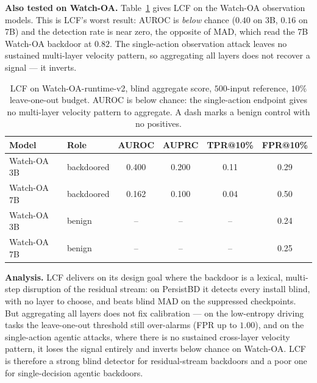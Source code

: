 \documentclass[11pt]{article}
\begin{document}
\textbf{Also tested on Watch-OA.} Table~\ref{tab:lcf-watchoa} gives LCF on the Watch-OA
observation models. This is LCF's worst result: AUROC is \emph{below} chance ($0.40$ on 3B, $0.16$
on 7B) and the detection rate is near zero, the opposite of MAD, which read the 7B Watch-OA backdoor
at $0.82$. The single-action observation attack leaves no sustained multi-layer velocity pattern, so
aggregating all layers does not recover a signal --- it inverts.

\begin{table}[H]
\centering
\begin{tabular}{llcccc}
\hline
Model & Role & AUROC & AUPRC & TPR@10\% & FPR@10\% \\
\hline
Watch-OA 3B & backdoored & 0.400 & 0.200 & 0.11 & 0.29 \\
Watch-OA 7B & backdoored & 0.162 & 0.100 & 0.04 & 0.50 \\
Watch-OA 3B & benign & -- & -- & -- & 0.24 \\
Watch-OA 7B & benign & -- & -- & -- & 0.25 \\
\hline
\end{tabular}
\caption{LCF on Watch-OA-runtime-v2, blind aggregate score, $500$-input reference, $10\%$
leave-one-out budget. AUROC is below chance: the single-action endpoint gives no multi-layer
velocity pattern to aggregate. A dash marks a benign control with no positives.}
\label{tab:lcf-watchoa}
\end{table}

\textbf{Analysis.} LCF delivers on its design goal where the backdoor is a lexical, multi-step
disruption of the residual stream: on PersistBD it detects every install blind, with no layer to
choose, and beats blind MAD on the suppressed checkpoints. But aggregating all layers does not fix
calibration --- on the low-entropy driving tasks the leave-one-out threshold still over-alarms
(FPR up to $1.00$), and on the single-action agentic attacks, where there is no sustained
cross-layer velocity pattern, it loses the signal entirely and inverts below chance on Watch-OA.
LCF is therefore a strong blind detector for residual-stream backdoors and a poor one for
single-decision agentic backdoors.
\end{document}

